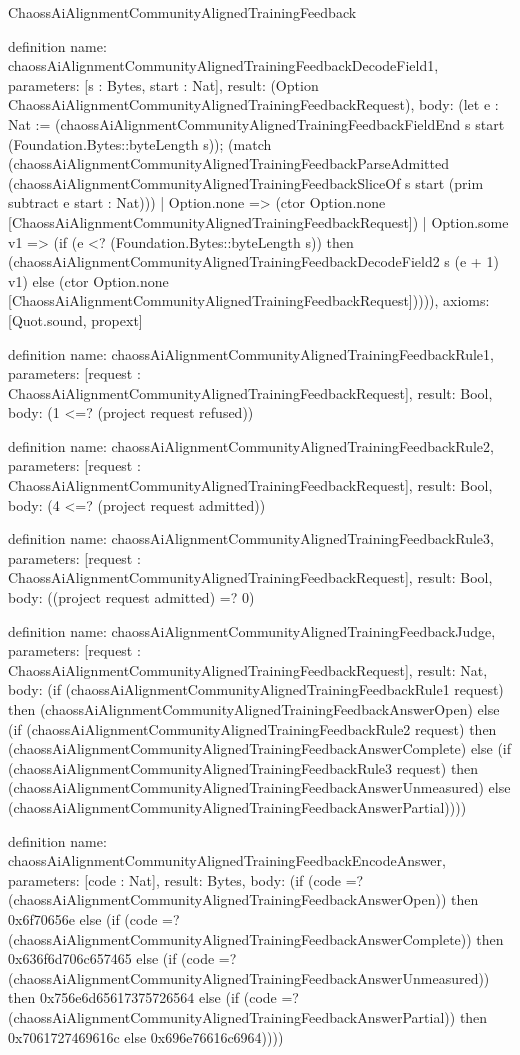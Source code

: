 \begin{lexlean}{ChaossAiAlignmentCommunityAlignedTrainingFeedback}
\begin{semanticmodule}
definition{
  name: chaossAiAlignmentCommunityAlignedTrainingFeedbackDecodeField1,
  parameters: [s : Bytes, start : Nat],
  result: (Option ChaossAiAlignmentCommunityAlignedTrainingFeedbackRequest),
  body: (let e : Nat := (chaossAiAlignmentCommunityAlignedTrainingFeedbackFieldEnd s start (Foundation.Bytes::byteLength s)); (match (chaossAiAlignmentCommunityAlignedTrainingFeedbackParseAdmitted (chaossAiAlignmentCommunityAlignedTrainingFeedbackSliceOf s start (prim subtract e start : Nat)))
    | Option.none => (ctor Option.none [ChaossAiAlignmentCommunityAlignedTrainingFeedbackRequest])
    | Option.some v1 => (if (e <? (Foundation.Bytes::byteLength s)) then (chaossAiAlignmentCommunityAlignedTrainingFeedbackDecodeField2 s (e + 1) v1) else (ctor Option.none [ChaossAiAlignmentCommunityAlignedTrainingFeedbackRequest])))),
  axioms: [Quot.sound, propext]
}

definition{
  name: chaossAiAlignmentCommunityAlignedTrainingFeedbackRule1,
  parameters: [request : ChaossAiAlignmentCommunityAlignedTrainingFeedbackRequest],
  result: Bool,
  body: (1 <=? (project request refused))
}

definition{
  name: chaossAiAlignmentCommunityAlignedTrainingFeedbackRule2,
  parameters: [request : ChaossAiAlignmentCommunityAlignedTrainingFeedbackRequest],
  result: Bool,
  body: (4 <=? (project request admitted))
}

definition{
  name: chaossAiAlignmentCommunityAlignedTrainingFeedbackRule3,
  parameters: [request : ChaossAiAlignmentCommunityAlignedTrainingFeedbackRequest],
  result: Bool,
  body: ((project request admitted) =? 0)
}

definition{
  name: chaossAiAlignmentCommunityAlignedTrainingFeedbackJudge,
  parameters: [request : ChaossAiAlignmentCommunityAlignedTrainingFeedbackRequest],
  result: Nat,
  body: (if (chaossAiAlignmentCommunityAlignedTrainingFeedbackRule1 request) then (chaossAiAlignmentCommunityAlignedTrainingFeedbackAnswerOpen) else (if (chaossAiAlignmentCommunityAlignedTrainingFeedbackRule2 request) then (chaossAiAlignmentCommunityAlignedTrainingFeedbackAnswerComplete) else (if (chaossAiAlignmentCommunityAlignedTrainingFeedbackRule3 request) then (chaossAiAlignmentCommunityAlignedTrainingFeedbackAnswerUnmeasured) else (chaossAiAlignmentCommunityAlignedTrainingFeedbackAnswerPartial))))
}

definition{
  name: chaossAiAlignmentCommunityAlignedTrainingFeedbackEncodeAnswer,
  parameters: [code : Nat],
  result: Bytes,
  body: (if (code =? (chaossAiAlignmentCommunityAlignedTrainingFeedbackAnswerOpen)) then 0x6f70656e else (if (code =? (chaossAiAlignmentCommunityAlignedTrainingFeedbackAnswerComplete)) then 0x636f6d706c657465 else (if (code =? (chaossAiAlignmentCommunityAlignedTrainingFeedbackAnswerUnmeasured)) then 0x756e6d65617375726564 else (if (code =? (chaossAiAlignmentCommunityAlignedTrainingFeedbackAnswerPartial)) then 0x7061727469616c else 0x696e76616c6964))))
}


\end{semanticmodule}
\end{lexlean}
